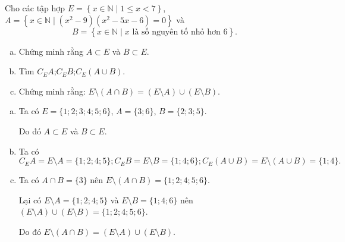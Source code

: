 \begin{bt}%
	Cho các tập hợp $E=\left\{ x\in \mathbb{N} \mid 1\le x<7 \right\}$, 
	$A=\left\{ x\in \mathbb{N} \mid \left( {{x}^{2}}-9 \right)\left( {{x}^{2}}-5x-6 \right)=0 \right\}$ và  \[B=\left\{ x\in \mathbb{N} \mid x \text{ là số nguyên tố nhỏ hơn } 6 \right\}.\]
	\begin{enumerate}  [a)]
		\item Chứng minh rằng $A\subset E$ và $B \subset E$.
		\item Tìm ${{C}_{E}}A$;${{C}_{E}}B$;${{C}_{E}}\left( A \cup B \right)$.
		\item Chứng minh rằng: 	 $E \setminus \left( A\cap B \right)=\left( E \setminus A \right)\cup \left( E \setminus B \right)$.	
	\end{enumerate}
	\loigiai
	{ \begin{enumerate}  [a)]
			\item Ta có $E=\{1;2;3;4;5;6\}$, $A =\{3;6\}$, $B=\{2;3;5\}$. 
			
			Do đó $A\subset E$ và $B \subset E$.
			\item Ta có $${{C}_{E}}A = E \setminus A = \{1;2;4;5 \}; {{C}_{E}}B =E \setminus B = \{1;4;6 \}; {{C}_{E}}\left( A \cup B \right) = E \setminus \left( A \cup B \right) = \{1;4\}.$$
			\item Ta có $ A\cap B  = \{3\}$ nên $E \setminus \left( A\cap B \right) = \{1;2;4;5;6\}$.
			
			Lại có $E \setminus A =\{1;2;4;5\}$ và $E \setminus B = \{1;4;6 \}$ nên $\left( E \setminus A \right)\cup \left( E \setminus B \right) =\{1;2;4;5;6\}$.
			
			Do đó $E \setminus \left( A\cap B \right)=\left( E \setminus A \right)\cup \left( E \setminus B \right)$.	
		\end{enumerate}
	}
\end{bt}

